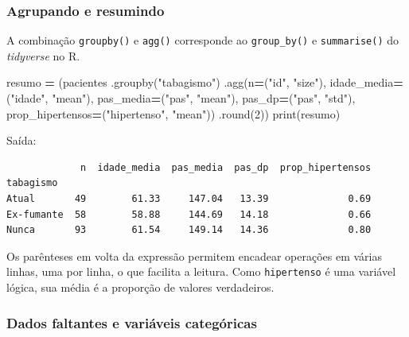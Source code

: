 \documentclass[
]{book}
\newenvironment{Shaded}{\begin{snugshade}}{\end{snugshade}}
\newcommand{\BuiltInTok}[1]{#1}
\newcommand{\DecValTok}[1]{\textcolor[rgb]{0.00,0.00,0.81}{#1}}
\newcommand{\NormalTok}[1]{#1}
\newcommand{\OperatorTok}[1]{\textcolor[rgb]{0.81,0.36,0.00}{\textbf{#1}}}
\newcommand{\StringTok}[1]{\textcolor[rgb]{0.31,0.60,0.02}{#1}}
\begin{document}
\subsubsection{Agrupando e resumindo}\label{agrupando-e-resumindo}

A combinação \texttt{groupby()} e \texttt{agg()} corresponde ao \texttt{group\_by()} e \texttt{summarise()} do \emph{tidyverse} no R.

\begin{Shaded}
\begin{Highlighting}[]
\NormalTok{resumo }\OperatorTok{=}\NormalTok{ (pacientes}
\NormalTok{          .groupby(}\StringTok{"tabagismo"}\NormalTok{)}
\NormalTok{          .agg(n}\OperatorTok{=}\NormalTok{(}\StringTok{"id"}\NormalTok{, }\StringTok{"size"}\NormalTok{),}
\NormalTok{               idade\_media}\OperatorTok{=}\NormalTok{(}\StringTok{"idade"}\NormalTok{, }\StringTok{"mean"}\NormalTok{),}
\NormalTok{               pas\_media}\OperatorTok{=}\NormalTok{(}\StringTok{"pas"}\NormalTok{, }\StringTok{"mean"}\NormalTok{),}
\NormalTok{               pas\_dp}\OperatorTok{=}\NormalTok{(}\StringTok{"pas"}\NormalTok{, }\StringTok{"std"}\NormalTok{),}
\NormalTok{               prop\_hipertensos}\OperatorTok{=}\NormalTok{(}\StringTok{"hipertenso"}\NormalTok{, }\StringTok{"mean"}\NormalTok{))}
\NormalTok{          .}\BuiltInTok{round}\NormalTok{(}\DecValTok{2}\NormalTok{))}
\BuiltInTok{print}\NormalTok{(resumo)}
\end{Highlighting}
\end{Shaded}

Saída:

\begin{verbatim}
             n  idade_media  pas_media  pas_dp  prop_hipertensos
tabagismo                                                       
Atual       49        61.33     147.04   13.39              0.69
Ex-fumante  58        58.88     144.69   14.18              0.66
Nunca       93        61.54     149.14   14.36              0.80
\end{verbatim}

Os parênteses em volta da expressão permitem encadear operações em várias linhas, uma por linha, o que facilita a leitura. Como \texttt{hipertenso} é uma variável lógica, sua média é a proporção de valores verdadeiros.

\subsubsection{Dados faltantes e variáveis categóricas}\label{dados-faltantes-e-variuxe1veis-categuxf3ricas}
\end{document}
